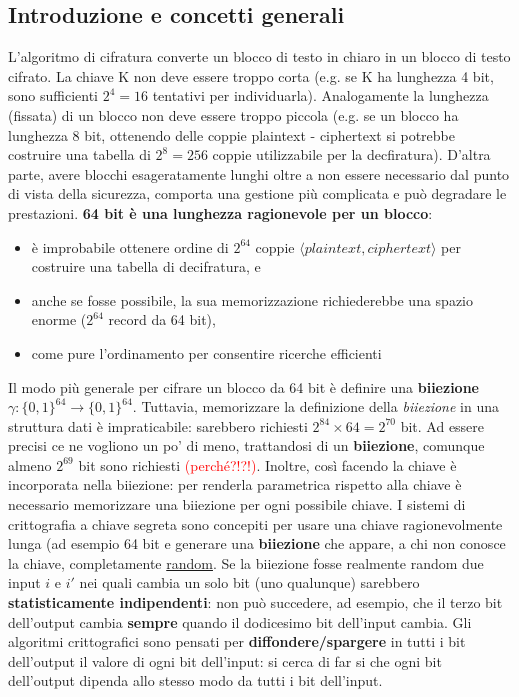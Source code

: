 \subsection{Introduzione e concetti generali}
L’algoritmo di cifratura converte un blocco di testo in chiaro in un blocco di testo cifrato. La chiave K non deve essere troppo corta (e.g. se K ha lunghezza 4 bit, sono sufficienti $2^4 = 16$ tentativi per individuarla). Analogamente la lunghezza (fissata) di un blocco non deve essere troppo piccola (e.g. se un blocco ha lunghezza 8 bit, ottenendo delle coppie plaintext - ciphertext si potrebbe costruire una tabella di $2^8 = 256$ coppie utilizzabile per la decfiratura).\newline 
D'altra parte, avere blocchi esageratamente lunghi oltre a non essere necessario dal punto di vista della sicurezza, comporta una gestione più complicata e può degradare le prestazioni. \textbf{64 bit è una lunghezza ragionevole per un blocco}: 
\begin{itemize}
  \item è improbabile ottenere ordine di $2^{64}$ coppie $\langle plaintext, ciphertext \rangle$ per costruire una tabella di decifratura, e
  \item anche se fosse possibile, la sua memorizzazione richiederebbe una spazio enorme ($2^{64}$ record da 64 bit),
  \item come pure l’ordinamento per consentire ricerche efficienti
\end{itemize}
Il modo più generale per cifrare un blocco da 64 bit è definire una \textbf{biiezione} $\gamma :\{0,1\}^{64} \rightarrow \{0,1\}^{64}$. Tuttavia, memorizzare la definizione della \emph{biiezione} in una struttura dati è impraticabile: sarebbero richiesti $2^84 \times 64 = 2^{70}$ bit. Ad essere precisi ce ne vogliono un po' di meno, trattandosi di un \textbf{biiezione}, comunque almeno $2^{69}$ bit sono richiesti \textcolor{red}{(perché?!?!)}. Inoltre, così facendo la chiave è incorporata nella biiezione: per renderla parametrica rispetto alla chiave è necessario memorizzare una biiezione per ogni possibile chiave.\newline \newline
I sistemi di crittografia a chiave segreta sono concepiti per usare una chiave ragionevolmente lunga (ad esempio 64 bit e generare una \textbf{biiezione} che appare, a chi non conosce la chiave, completamente \underline{random}. Se la biiezione fosse realmente random due input $i$ e $i'$ nei quali cambia un solo bit (uno qualunque) sarebbero \textbf{statisticamente indipendenti}: non può succedere, ad esempio, che il terzo bit dell'output cambia \textbf{sempre} quando il dodicesimo bit dell'input cambia. Gli algoritmi crittografici sono pensati per \textbf{diffondere/spargere} in tutti i bit dell'output il valore di ogni bit dell'input: si cerca di far si che ogni bit dell'output dipenda allo stesso modo da tutti i bit dell'input.

